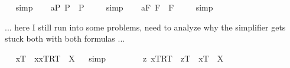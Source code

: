 \begin{isabellebody}
\isadelimproof
\ %
\endisadelimproof
%
\isatagproof
{}\isamarkupfalse%
\ simp\ \isamarkupfalse%
%
\endisatagproof
{\isafoldproof}%
%
\isadelimproof
%
\endisadelimproof
\isanewline
\ \isamarkupfalse%
\ a{}{}{\isacharunderscore}{}{\isacharunderscore}P{\isacharcolon}\ {\isachardoublequoteopen}{\isacharbrackleft}\isactrlbold {\isasymbox}{\isasymphi}\isactrlsup P\ \isactrlbold {\isasymequiv}\ \isactrlbold {\isasymA}{\isacharparenleft}\isactrlbold {\isasymbox}{\isasymphi}\isactrlsup P{\isacharparenright}{\isacharbrackright}\ {\isacharequal}\ {\isasymtop}{\isachardoublequoteclose}%
\isadelimproof
\ %
\endisadelimproof
%
\isatagproof
{}\isamarkupfalse%
\ simp\ \isamarkupfalse%
%
\endisatagproof
{\isafoldproof}%
%
\isadelimproof
%
\endisadelimproof
\isanewline
\ \isamarkupfalse%
\ a{}{}{\isacharunderscore}{}{\isacharunderscore}F{\isacharcolon}\ {\isachardoublequoteopen}{\isacharbrackleft}\isactrlbold {\isasymbox}{\isasymphi}\isactrlsup F\ \isactrlbold {\isasymequiv}\ \isactrlbold {\isasymA}{\isacharparenleft}\isactrlbold {\isasymbox}{\isasymphi}\isactrlsup F{\isacharparenright}{\isacharbrackright}\ {\isacharequal}\ {\isasymtop}{\isachardoublequoteclose}%
\isadelimproof
\ %
\endisadelimproof
%
\isatagproof
{}\isamarkupfalse%
\ simp\ \isamarkupfalse%
%
\endisatagproof
{\isafoldproof}%
%
\isadelimproof
%
\endisadelimproof
%
\isamarkuptrue%
%
\begin{isamarkuptext}%
... here I still run into some problems, need to analyze why the simplifier gets stuck both
  with both formulas ...%
\end{isamarkuptext}%
\isamarkuptrue%
\ \isamarkupfalse%
\ {\isachardoublequoteopen}{\isacharparenleft}x\isactrlsup T\ \isactrlbold {\isacharequal}\ {\isacharparenleft}\isactrlbold {\isasymiota}x{\isachardot}{\isasymlbrace}x\isactrlsup T{\isacharcomma}R\isactrlsup T{\isasymrbrace}{\isacharparenright}{\isacharparenright}\ {\isacharequal}\ X{\isachardoublequoteclose}%
\isadelimproof
\ %
\endisadelimproof
%
\isatagproof
{}\isamarkupfalse%
\ simp\ \isamarkupfalse%
\ \ \ \ %
%
\endisatagproof
{\isafoldproof}%
%
\isadelimproof
%
\endisadelimproof
\isanewline
\ \isamarkupfalse%
\ {\isachardoublequoteopen}{\isacharparenleft}\isactrlbold {\isasymforall}z{\isachardot}\ {\isacharparenleft}\isactrlbold {\isasymA}{\isacharparenleft}{\isasymlbrace}x\isactrlsup T{\isacharcomma}R\isactrlsup T{\isasymrbrace}{\isacharparenright}\ \isactrlbold {\isasymequiv}\ {\isacharparenleft}z\isactrlsup T\ \isactrlbold {\isacharequal}\ x\isactrlsup T{\isacharparenright}{\isacharparenright}{\isacharparenright}\ {\isacharequal}\ X{\isachardoublequoteclose}%

\end{isabellebody}
